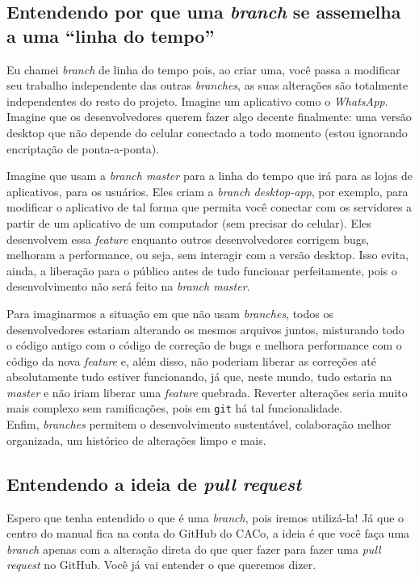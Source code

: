\documentclass[a4paper,oneside,10pt]{memoir}
\begin{document}
\subsection{Entendendo por que uma \emph{branch} se assemelha a uma ``linha do
tempo''}

Eu chamei \emph{branch} de linha do tempo pois, ao criar uma, você passa a
modificar seu trabalho independente das outras \emph{branches}, as suas
alterações são totalmente independentes do resto do projeto. Imagine um
aplicativo como o \emph{WhatsApp}. Imagine que os desenvolvedores querem fazer
algo decente finalmente: uma versão desktop que não depende do celular conectado
a todo momento (estou ignorando encriptação de ponta-a-ponta).

Imagine que usam a \emph{branch master} para a linha do tempo que irá para as
lojas de aplicativos, para os usuários. Eles criam a \emph{branch desktop-app},
por exemplo, para modificar o aplicativo de tal forma que permita você conectar
com os servidores a partir de um aplicativo de um computador (sem precisar do
celular). Eles desenvolvem essa \emph{feature} enquanto outros desenvolvedores
corrigem bugs, melhoram a performance, ou seja, sem interagir com a versão
desktop. Isso evita, ainda, a liberação para o público antes de tudo funcionar
perfeitamente, pois o desenvolvimento não será feito na \emph{branch master}.

Para imaginarmos a situação em que não usam \emph{branches}, todos os
desenvolvedores estariam alterando os mesmos arquivos juntos, misturando todo o
código antigo com o código de correção de bugs e melhora performance com o
código da nova \emph{feature} e, além disso, não poderiam liberar as correções
até absolutamente tudo estiver funcionando, já que, neste mundo, tudo estaria na
\emph{master} e não iriam liberar uma \emph{feature} quebrada. Reverter
alterações seria muito mais complexo sem ramificações, pois em \texttt{git} há
tal funcionalidade.
\\

Enfim, \emph{branches} permitem o desenvolvimento sustentável, colaboração
melhor organizada, um histórico de alterações limpo e mais.

\subsection{Entendendo a ideia de \emph{pull request}}

Espero que tenha entendido o que é uma \emph{branch}, pois iremos utilizá-la!
Já que o centro do manual fica na conta do GitHub do CACo, a ideia é que você
faça uma \emph{branch} apenas com a alteração direta do que quer fazer para
fazer uma \emph{pull request} no GitHub. Você já vai entender o que queremos
dizer.
\end{document}
